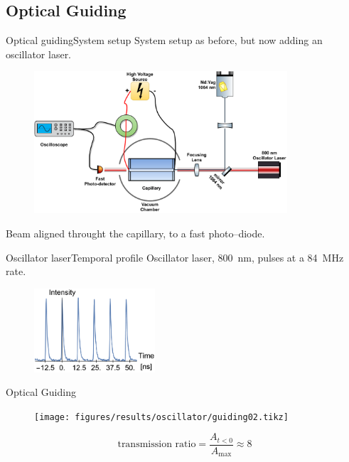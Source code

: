 \documentclass[dvipsnames]{beamer}
\begin{document}
\subsection{Optical Guiding}
 \begin{frame}{Optical guiding}{System setup}
System setup as before, but now adding an oscillator laser.
\begin{figure}
 \includegraphics[height=150pt]{figures/results/oscillator/oscillator_system_setup.pdf} 
\end{figure}
Beam aligned throught the capillary, to a fast photo--diode.
 \end{frame}
 \begin{frame}{Oscillator laser}{Temporal profile}
Oscillator laser, \SI{800}{\nm}, pulses at a \SI{84}{\MHz} rate.
\begin{figure}
  \includegraphics[width=0.4\textwidth]{figures/results/oscillator/single.PNG}
\end{figure}
 \end{frame}
\begin{frame}{Optical Guiding}
\begin{figure}
  \texttt{[image: figures/results/oscillator/guiding02.tikz]}
\end{figure}
\begin{equation*}
\text{transmission ratio} = \frac{A_{t<0}}{A_\text{max}} \approx 8
\end{equation*}
\end{frame}
\end{document}
